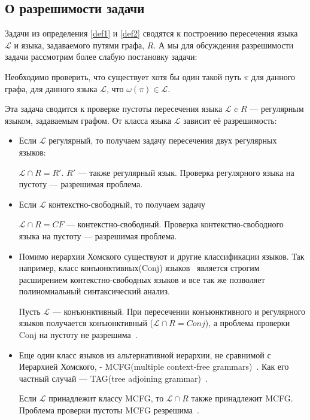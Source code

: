 \subsection{О разрешимости задачи}

Задачи из определения \ref{def1} и \ref{def2} сводятся к построению пересечения языка $\mathcal{L}$ и языка, задаваемого путями графа, $R$. 
А мы для обсуждения разрешимости задачи рассмотрим более слабую постановку задачи:

\begin{definition}
	Необходимо проверить, что существует хотя бы один такой путь $\pi$ для данного графа, для данного языка $\mathcal{L}$, что $\omega(\pi) \in \mathcal{L}$.
	
\end{definition}

Эта задача сводится к проверке пустоты пересечения языка $\mathcal{L}$ c $R$ --- регулярным языком, задаваемым графом. От класса языка $\mathcal{L}$ зависит её разрешимость:

\begin{itemize}
	\item Если $\mathcal{L}$ регулярный, то получаем задачу пересечения двух регулярных языков: 
	
	$\mathcal{L} \cap R = R'$.
	$R'$ --- также регулярный язык.
	Проверка регулярного языка на пустоту --- разрешимая проблема.
	
	\item Если $\mathcal{L}$ контекстно-свободный, то получаем задачу
	
	$\mathcal{L} \cap R = CF$ --- контекстно-свободный.
	Проверка контекстно-свободного языка на пустоту --- разрешимая проблема.
	
	\item Помимо иерархии Хомского существуют и другие классификации языков.
	Так например, класс конъюнктивных(Conj)
	языков~\cite{DBLP:journals/jalc/Okhotin01}
	является строгим расширением контекстно-свободных языков и все так же позволяет полиномиальный синтаксический анализ.
	
	Пусть $\mathcal{L}$ --- конъюнктивный. При пересечении конъюнктивного и регулярного языков получается конъюнктивный ($\mathcal{L} \cap R = Conj$), а проблема проверки Conj на пустоту не разрешима~\cite{DBLP:journals/tcs/Okhotin03a}.
	
	\item Еще один класс языков из альтернативной иерархии, не сравнимой с Иерархией Хомского, - MCFG(multiple context-free grammars)~\cite{SEKI1991191}.
	Как его частный случай --- TAG(tree adjoining grammar)~\cite{Joshi1997}.
	
	Если $\mathcal{L}$ принадлежит классу MCFG, то $\mathcal{L} \cap R$ также принадлежит MCFG. Проблема проверки пустоты MCFG резрешима~\cite{SEKI1991191}.
	
\end{itemize}

